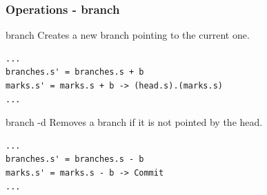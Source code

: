 \documentclass{beamer}
\begin{document}
\begin{frame}[fragile]
   \frametitle{Operations - branch}
   \begin{block}{branch}
      Creates a new branch pointing to the current one.
   \end{block}
   \tiny
   \begin{lstlisting}
...
branches.s' = branches.s + b
marks.s' = marks.s + b -> (head.s).(marks.s)
...
   \end{lstlisting}
   \normalsize
   \begin{block}{branch -d}
      Removes a branch if it is not pointed by the head.
   \end{block}
   \tiny
   \begin{lstlisting}
...
branches.s' = branches.s - b
marks.s' = marks.s - b -> Commit
...
   \end{lstlisting}
\end{frame}
\end{document}
